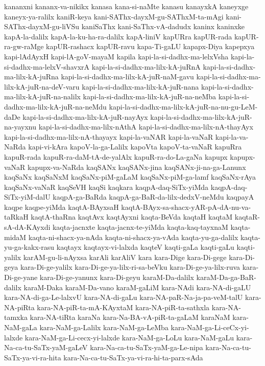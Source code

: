 {kananxni
kananx-va-nikikx
kanasa
kana-si-naMte
kanasu
kanayxkA
kaneyxge
kaneyx-ya-ralilx
kaniR-keya
kani-SAThx-dayxM-gu-SAThxM-ta-mAgi
kani-SAThx-dayxM-gu-liVSu
kaniSaThx
kani-SaThx-vA-dadudx
kaninx
kaninxke
kapA-la-dalilx
kapA-la-ku-ha-ra-dalilx
kapA-liniV
kapURra
kapUR-rada
kapUR-ra-gw-raMge
kapUR-rashacx
kapUR-ravu
kapa-Ti-gaLU
kapapx-Diya
kapepxya
kapi-lAdAyxH
kapi-lA-goV-mayaM
kapila
kapi-la-si-dadhx-ma-lelxVsha
kapi-la-si-dadhx-ma-lelxV-shavxrA
kapi-la-si-dadhx-ma-lilx-kA-juRnA
kapi-la-si-dadhx-ma-lilx-kA-juRna
kapi-la-si-dadhx-ma-lilx-kA-juR-naM-gavu
kapi-la-si-dadhx-ma-lilx-kA-juR-na-deV-varu
kapi-la-si-dadhx-ma-lilx-kA-juR-nana
kapi-la-si-dadhx-ma-lilx-kA-juR-na-nalilx
kapi-la-si-dadhx-ma-lilx-kA-juR-na-neMba
kapi-la-si-dadhx-ma-lilx-kA-juR-na-neMdu
kapi-la-si-dadhx-ma-lilx-kA-juR-na-nu-gu-LeM-daDe
kapi-la-si-dadhx-ma-lilx-kA-juR-nayAyx
kapi-la-si-dadhx-ma-lilx-kA-juR-na-yayxnu
kapi-la-si-dadhx-ma-lilx-nAthA
kapi-la-si-dadhx-ma-lilx-nA-thayAyx
kapi-la-si-dadhx-ma-lilx-nA-thayayx
kapi-la-vaNAR
kapi-la-vaNaR
kapi-la-va-NaRda
kapi-vi-kAra
kapoV-la-ga-Lalilx
kapoVta
kapoV-ta-vaNaR
kapuRra
kapuR-rada
kapuR-ra-daM-tA-de-yalAlx
kapuR-ra-do-La-gaNa
kapupx
kapupx-vaNaR
kapupx-va-NaRda
kaqSANx
kaqSANx-jina
kaqSANx-ji-na-ga-Lanunx
kaqSaNx
kaqSaNxM
kaqSaNx-piM-gaLaM
kaqSaNx-piM-ga-lamf
kaqSaNx-rAya
kaqSaNx-vaNaR
kaqSeVH
kaqSi
kaqkara
kaqpA-daq-SiTx-yiMda
kaqpA-daq-SiTx-yiM-dalU
kaqpA-ga-BaRda
kaqpA-ga-BaR-da-lilx-dedxV-neMdu
kaqpayA
kaqpe
kaqpe-yiMda
kaqtA-BAyxsaH
kaqtA-BAyx-sa-shacx-yAR-pA-dA-nu-va-taRkaH
kaqtA-thaRna
kaqtAvx
kaqtAyxni
kaqta-BeVda
kaqtaH
kaqtaM
kaqtaR-sA-dA-KAyxdi
kaqta-jacnxte
kaqta-jacnx-te-yiMda
kaqta-kaq-tayxnaM
kaqta-midaM
kaqta-ni-shacx-ya-nAda
kaqta-ni-shacx-ya-vAda
kaqta-yu-ga-dalilx
kaqta-yu-ga-kakx-rasu
kaqtayx
kaqtayx-vi-lalxda
kaqteV
kaqti-gaLa
kaqti-gaLu
kaqti-yalilx
karAM-gu-li-nAyxsa
karAli
karAliV
kara
kara-Dige
kara-Di-gege
kara-Di-geya
kara-Di-ge-yalilx
kara-Di-ge-ya-lilx-ri-sa-beVku
kara-Di-ge-ya-lilx-ruva
kara-Di-ge-yane
kara-Di-ge-yanunx
kara-Di-geyu
karaM-Da-dalilx
karaM-Da-ga-BaR-dalilx
karaM-Daka
karaM-Da-vano
karaM-gaLiM
kara-NAdi
kara-NA-di-gaLU
kara-NA-di-ga-Le-lalxvU
kara-NA-di-gaLu
kara-NA-paR-Na-ja-pa-veM-talU
kara-NA-piRta
kara-NA-piR-ta-mA-KAyxtaM
kara-NA-piR-ta-sathxla
kara-NA-tamxka
kara-NA-tiRta
karaNa
kara-Na-BA-vA-piR-ta-gaLaM
karaNaM
kara-NaM-gaLa
kara-NaM-ga-Lalilx
kara-NaM-ga-LeMba
kara-NaM-ga-Li-ceCx-yi-lalxde
kara-NaM-ga-Li-cecx-yi-lalxde
kara-NaM-ga-LoLu
kara-NaM-gaLu
kara-Na-ca-tu-SaTx-yaM-gaLeV
kara-Na-ca-tu-SaTx-yaM-ga-Le-nipa
kara-Na-ca-tu-SaTx-ya-vi-ra-hita
kara-Na-ca-tu-SaTx-ya-vi-ra-hi-ta-parx-sAda
}
